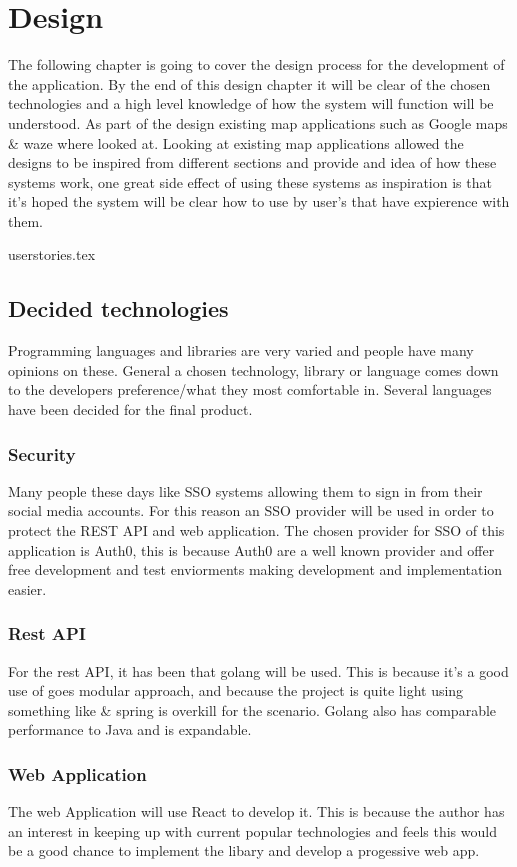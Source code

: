 \section{Design}
The following chapter is going to cover the design process for the development of the application. By the end of this design chapter it will be clear of the chosen technologies and a high level knowledge of how the system will function will be understood. As part of the design existing map applications such as Google maps \& waze where looked at. Looking at existing map applications allowed the designs to be inspired from different sections and provide and idea of how these systems work, one great side effect of using these systems as inspiration is that it's hoped the system will be clear how to use by user's that have expierence with them.

{userstories.tex}

\subsection{Decided technologies}
Programming languages and libraries are very varied and people have many opinions on these. General a chosen technology, library or language comes down to the developers preference/what they most comfortable in. Several languages have been decided for the final product.

\subsubsection{Security}
Many people these days like SSO systems allowing them to sign in from their social media accounts. For this reason an SSO provider will be used in order to protect the REST API and web application. The chosen provider for SSO of this application is Auth0, this is because Auth0 are a well known provider and offer free development and test enviorments making development and implementation easier.

\subsubsection{Rest API}
For the rest API, it has been that golang will be used. This is because it's a good use of goes modular approach, and because the project is quite light using something like \& spring is overkill for the scenario. Golang also has comparable performance to Java and is expandable.

\subsubsection{Web Application}
The web Application will use React to develop it. This is because the author has an interest in keeping up with current popular technologies and feels this would be a good chance to implement the libary and develop a progessive web app. 

